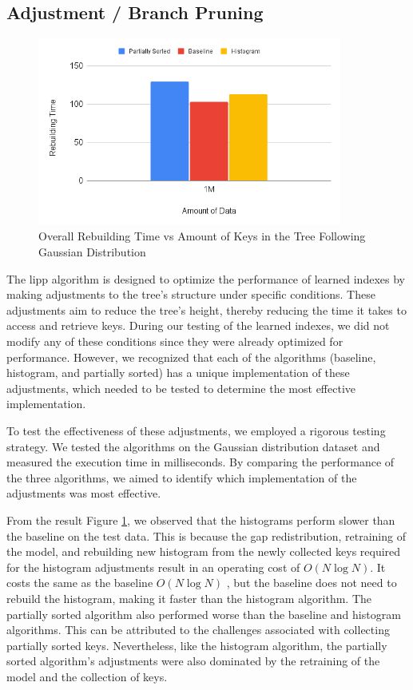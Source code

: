 \subsection{Adjustment / Branch Pruning}
\begin{figure}[H]
    \centering
    \includegraphics[width=100mm,scale=1]{Figures/RebuildingGaussian.png}
    \caption{
     Overall Rebuilding Time vs Amount of Keys in the Tree Following Gaussian Distribution
    }
    \label{fig:RebuildingGaussian}
\end{figure}
The \acrfull{lipp} algorithm is designed to optimize the performance of learned indexes by making adjustments to the tree's structure under specific conditions. These adjustments aim to reduce the tree's height, thereby reducing the time it takes to access and retrieve keys. During our testing of the learned indexes, we did not modify any of these conditions since they were already optimized for performance. However, we recognized that each of the algorithms (baseline, histogram, and partially sorted) has a unique implementation of these adjustments, which needed to be tested to determine the most effective implementation.

To test the effectiveness of these adjustments, we employed a rigorous testing strategy. We tested the algorithms on the Gaussian distribution dataset and measured the execution time in milliseconds. By comparing the performance of the three algorithms, we aimed to identify which implementation of the adjustments was most effective.

From the result Figure \ref{fig:RebuildingGaussian}, we observed that the histograms perform slower than the baseline on the test data. This is because the gap redistribution, retraining of the model, and rebuilding new histogram from the newly collected keys required for the histogram adjustments result in an operating cost of $O(N\log N)$. It costs the same as the baseline $O(N\log N)$ \cite{LIPP}, but the baseline does not need to rebuild the histogram, making it faster than the histogram algorithm. The partially sorted algorithm also performed worse than the baseline and histogram algorithms. This can be attributed to the challenges associated with collecting partially sorted keys. Nevertheless, like the histogram algorithm, the partially sorted algorithm's adjustments were also dominated by the retraining of the model and the collection of keys.



